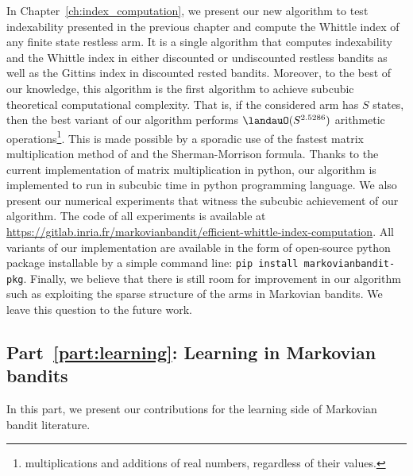 In Chapter~\ref{ch:index_computation}, we present our new algorithm to test indexability presented in the previous chapter and compute the Whittle index of any finite state restless arm.
It is a single algorithm that computes indexability and the Whittle index in either discounted or undiscounted restless bandits as well as the Gittins index in discounted rested bandits.
Moreover, to the best of our knowledge, this algorithm is the first algorithm to achieve subcubic theoretical computational complexity.
That is, if the considered arm has $S$ states, then the best variant of our algorithm performs $\landauO(S^{2.5286})$ arithmetic operations\footnote{multiplications and additions of real numbers, regardless of their values.}.
This is made possible by a sporadic use of the fastest matrix multiplication method of \cite{coppersmith1987matrix} and the Sherman-Morrison formula.
Thanks to the current implementation of matrix multiplication in python, our algorithm is implemented to run in subcubic time in python programming language.
We also present our numerical experiments that witness the subcubic achievement of our algorithm.
The code of all experiments is available at \url{https://gitlab.inria.fr/markovianbandit/efficient-whittle-index-computation}.
All variants of our implementation are available in the form of open-source python package installable by a simple command line: \texttt{pip install markovianbandit-pkg}.
Finally, we believe that there is still room for improvement in our algorithm such as exploiting the sparse structure of the arms in Markovian bandits.
We leave this question to the future work.

\subsection{Part~{\ref{part:learning}}: Learning in Markovian bandits}

In this part, we present our contributions for the learning side of Markovian bandit literature.

